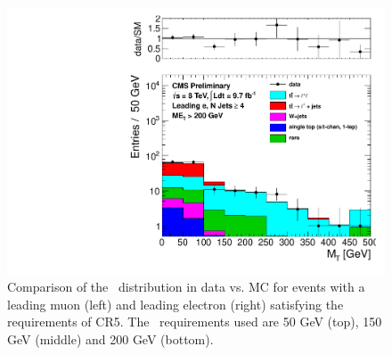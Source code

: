 \begin{figure}[hbt]
\begin{center}
        \includegraphics[width=0.5\linewidth]{plots/CR5plots/mt_met200_leadele_nj4.pdf}
    \caption{
      Comparison of the \mt\ distribution in data vs. MC for events
      with a leading muon (left) and leading electron (right)
      satisfying the requirements of CR5. The \met\ requirements used are
      50 GeV (top), 150 GeV (middle) and 200 GeV (bottom).
\label{fig:cr5mtrest} 
}  
      \end{center}
\end{figure}


\clearpage

